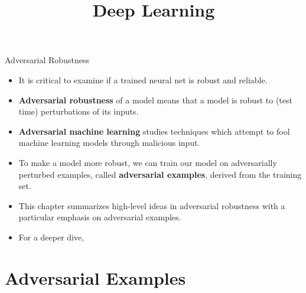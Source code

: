 




\title{Deep Learning}

\date{}


\newcommand{\titlefigure}{plots/dog.png}
\newcommand{\learninggoals}{
  \item adversarial robustness
  \item adversarial examples
  \item adversarial training 
  \item projected gradient descent
  \item fast gradient sign method
}



\newcommand{\Dsubtrain}{\mathcal{D}_{\text{subtrain}}}
\newcommand{\Dval}{\mathcal{D}_{\text{val}}}


\begin{frame}{Adversarial Robustness}
    \begin{itemize}
        \item It is critical to examine if a trained neural net is robust and reliable. 
        \item \textbf{Adversarial robustness} of a model means that a model is robust to (test time) perturbations of its inputs. 
        \item \textbf{Adversarial machine learning} studies techniques which attempt  to fool machine learning models through malicious input.
        \item To make a model more robust, we can train our model on adversarially perturbed examples, called \textbf{adversarial examples}, derived from the training set.  
        \item This chapter summarizes  high-level ideas in adversarial robustness with a particular emphasis on adversarial examples.
        \item For a deeper dive, \href{https://adversarial-ml-tutorial.org/}{}
    \end{itemize}
\end{frame}


\section{Adversarial Examples}

